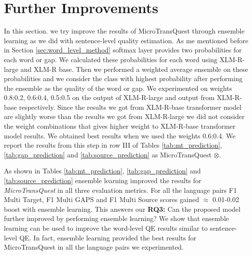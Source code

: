 \section{Further Improvements}
\label{sec:word_level_further}
In this section. we try improve the results of MicroTransQuest through ensemble learning as we did with sentence-level quality estimation. As me mentioned before in Section \ref{sec:word_level_method} softmax layer provides two probabilities for each word or gap. We calculated these probabilities for each word using XLM-R-large and XLM-R base. Then we performed a weighted average ensemble on these probabilities and we consider the class with highest probability after performing the ensemble as the quality of the word or gap. We experimented on weights 0.8:0.2, 0.6:0.4, 0.5:0.5 on the output of XLM-R-large and output from XLM-R-base respectively. Since the results we got from XLM-R-base transformer model are slightly worse than the results we got from XLM-R-large we did not consider the weight combinations that gives higher weight to XLM-R-base transformer model results. We obtained best results when we used the weights 0.6:0.4. We report the results from this step in row III of Tables \ref{tab:mt_prediction}, \ref{tab:gap_prediction} and \ref{tab:source_prediction} as MicroTransQuest $\otimes$.

As shown in Tables \ref{tab:mt_prediction}, \ref{tab:gap_prediction} and \ref{tab:source_prediction} ensemble learning improved the results for \textit{MicroTransQuest} in all three evaluation metrics. For all the language pairs F1 Multi Target, F1 Multi GAPS and F1 Multi Source scores gained $\approx$ 0.01-0.02 boost with ensemble learning. This answers our \textbf{RQ3:} Can the proposed model further improved by performing ensemble learning? We show that ensemble learning can be used to improve the word-level QE results similar to sentence-level QE. In fact, ensemble learning provided the best results for MicroTransQuest in all the language pairs we experimented.

